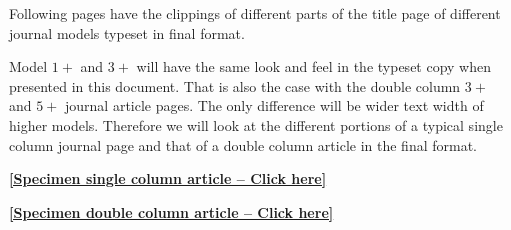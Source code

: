 \documentclass[a4paper,12pt]{article}
\begin{document}
Following pages have the clippings of different parts of
the title page of different journal models typeset in final
format.

Model $1+$ and $3+$  will have the same look and
feel in the typeset copy when presented in this document. That is
also the case with the double column $3+$ and $5+$ journal article
pages. The only difference will be wider text width of
higher models.  Therefore we will look at the
different portions of a typical single column journal page and
that of a double column article in the final format.


\begin{center}
\hypertarget{bsc}{}
\hyperlink{sc}{
{\bf [Specimen single column article -- Click here]}
}


\hypertarget{bsc}{}
\hyperlink{dc}{
{\bf [Specimen double column article -- Click here]}
}
\end{center}

\src{}\hypertarget{sc}{}
\def\rulecolor{blue!70}
\hyperlink{bsc}{}
\def\rulecolor{orange}

\src{}\hypertarget{dc}{}
\def\rulecolor{blue!70}
\hyperlink{bsc}{}
\def\rulecolor{orange}
\end{document}
